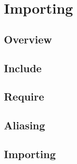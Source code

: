 \part{Importing}


\chapter{Overview}



\chapter{Include}



\chapter{Require}


\chapter{Aliasing}


\chapter{Importing}


